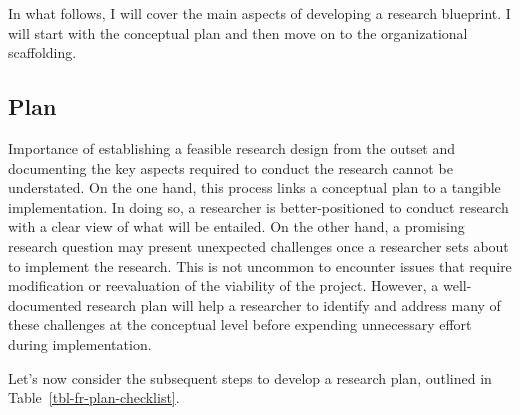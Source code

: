 \documentclass[
  letterpaper,
  DIV=11,
  numbers=noendperiod]{scrreprt}
\theoremstyle{definition}
\theoremstyle{remark}
\begin{document}
In what follows, I will cover the main aspects of developing a research
blueprint. I will start with the conceptual plan and then move on to the
organizational scaffolding.

\subsection{Plan}\label{sec-fr-plan}

Importance of establishing a feasible research design from the outset
and documenting the key aspects required to conduct the research cannot
be understated. On the one hand, this process links a conceptual plan to
a tangible implementation. In doing so, a researcher is
better-positioned to conduct research with a clear view of what will be
entailed. On the other hand, a promising research question may present
unexpected challenges once a researcher sets about to implement the
research. This is not uncommon to encounter issues that require
modification or reevaluation of the viability of the project. However, a
well-documented research plan will help a researcher to identify and
address many of these challenges at the conceptual level before
expending unnecessary effort during implementation.

Let's now consider the subsequent steps to develop a research plan,
outlined in Table~\ref{tbl-fr-plan-checklist}.
\end{document}
